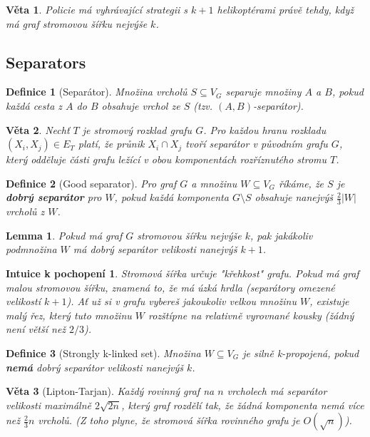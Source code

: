 \documentclass[a4paper,11pt]{article}
\newtheorem{definition}{Definice}[section]
\newtheorem{theorem}{Věta}[section]
\newtheorem{lemma}{Lemma}[section]
\newtheorem*{intuition}{Intuice k pochopení}
\begin{document}
\begin{theorem}
Policie má vyhrávající strategii s $k+1$ helikoptérami právě tehdy, když má graf stromovou šířku nejvýše $k$.
\end{theorem}

\subsection{Separators}

\begin{definition}[Separátor]
Množina vrcholů $S \subseteq V_G$ separuje množiny $A$ a $B$, pokud každá cesta z $A$ do $B$ obsahuje vrchol ze $S$ (tzv. $(A,B)$-separátor).
\end{definition}

\begin{theorem}
Nechť $T$ je stromový rozklad grafu $G$. Pro každou hranu rozkladu $(X_i, X_j) \in E_T$ platí, že průnik $X_i \cap X_j$ tvoří separátor v původním grafu $G$, který odděluje části grafu ležící v obou komponentách rozříznutého stromu $T$.
\end{theorem}

\begin{definition}[Good separator]
Pro graf $G$ a množinu $W \subseteq V_G$ říkáme, že $S$ je \textbf{dobrý separátor} pro $W$, pokud každá komponenta $G \setminus S$ obsahuje nanejvýš $\frac{2}{3} |W|$ vrcholů z $W$.
\end{definition}

\begin{lemma}
Pokud má graf $G$ stromovou šířku nejvýše $k$, pak jakákoliv podmnožina $W$ má dobrý separátor velikosti nanejvýš $k+1$.
\end{lemma}

\begin{intuition}
Stromová šířka určuje "křehkost" grafu. Pokud má graf malou stromovou šířku, znamená to, že má úzká hrdla (separátory omezené velikostí $k+1$). Ať už si v grafu vybereš jakoukoliv velkou množinu $W$, existuje malý řez, který tuto množinu $W$ rozštípne na relativně vyrovnané kousky (žádný není větší než $2/3$). 
\end{intuition}

\begin{definition}[Strongly k-linked set]
Množina $W \subseteq V_G$ je silně k-propojená, pokud \textbf{nemá} dobrý separátor velikosti nanejvýš $k$.
\end{definition}

\begin{theorem}[Lipton-Tarjan]
Každý rovinný graf na $n$ vrcholech má separátor velikosti maximálně $2\sqrt{2n}$, který graf rozdělí tak, že žádná komponenta nemá více než $\frac{2}{3}n$ vrcholů. (Z toho plyne, že stromová šířka rovinného grafu je $O(\sqrt{n})$).
\end{theorem}
\end{document}
